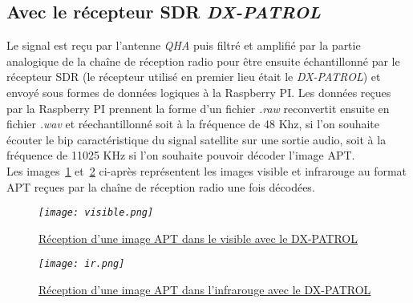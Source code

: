 \documentclass[12pt,fleqn]{book} %
\begin{document}
\subsection{Avec le récepteur SDR \emph{DX-PATROL}}
Le signal est reçu par l'antenne \emph{QHA} puis filtré et amplifié par la partie analogique de la chaîne de réception radio pour être ensuite échantillonné par le récepteur SDR (le récepteur utilisé en premier lieu était le \emph{DX-PATROL}) et envoyé sous formes de données logiques à la Raspberry PI. Les données reçues par la Raspberry PI prennent la forme d'un fichier \emph{.raw} reconvertit ensuite en fichier \emph{.wav} et réechantillonné soit à la fréquence de 48 Khz, si l'on souhaite écouter le bip caractéristique du signal satellite sur une sortie audio, soit à la fréquence de 11025 KHz si l'on souhaite pouvoir décoder l'image APT.
~\\Les images~\underline{\color{blue}\ref{visible}} et~\underline{\color{blue}\ref{ir}} ci-après représentent les images visible et infrarouge au format APT reçues par la chaîne de réception radio une fois décodées.
\begin{figure}[H]
	\centering
	\itshape
	\texttt{[image: visible.png]}
	\caption{\label{visible} \underline{Réception d'une image APT dans le visible avec le DX-PATROL}}
\end{figure}
\begin{figure}[H]
	\centering
	\itshape
	\texttt{[image: ir.png]}
	\caption{\label{ir} \underline{Réception d'une image APT dans l'infrarouge avec le DX-PATROL}}
\end{figure}
\end{document}
